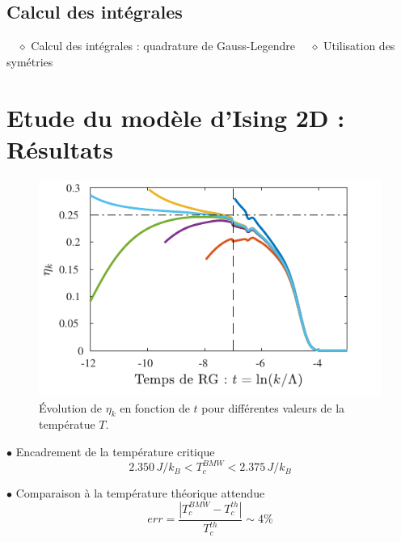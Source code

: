 \documentclass[9pt]{beamer}
\begin{document}
	\subsection{Calcul des intégrales}
		\begin{frame}
	\justifying
	\vspace*{22pt}
	
	$\quad \diamond$ Calcul des intégrales : quadrature de Gauss-Legendre
	$\quad \diamond$ Utilisation des symétries
		\end{frame}
		
		\section{Etude du modèle d'Ising 2D : Résultats}
		\sommaire{}
		\begin{frame}
	\justifying
	\vspace*{22pt}
	
	\begin{figure}[H]
\begin{center}
	\includegraphics[scale=0.7]{MesuRes.pdf}
\end{center}
\caption{Évolution de $\eta_k$ en fonction de $t$ pour différentes valeurs de la températue $T$.}
\label{fig:etaMesu}
\end{figure}

$\bullet$ Encadrement de la température critique
\begin{equation}
2.350 \, J/k_B < T_c^{BMW}  < 2.375 \, J/k_B
\end{equation}

$\bullet $ Comparaison à la température théorique attendue
\begin{equation}
	err = \frac{ |T_c^{BMW} - T_c^{th}|}{T_c^{th}} \sim 4 \%
\end{equation}



	
	\end{frame}
\end{document}
